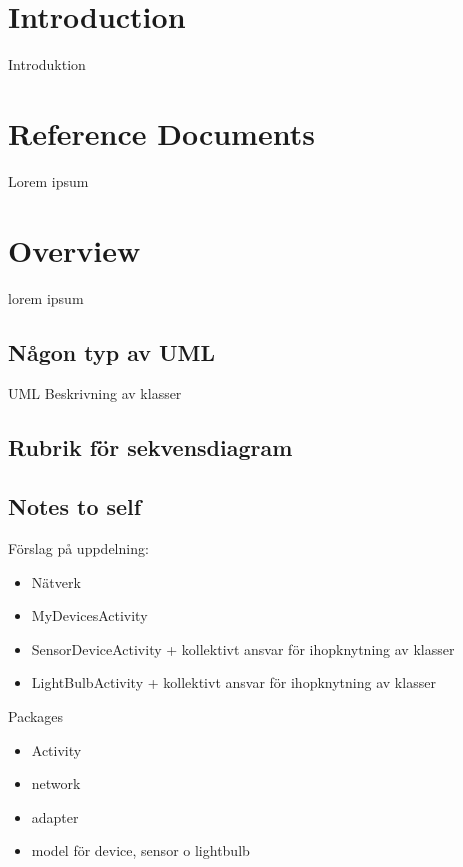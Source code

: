 \documentclass[a4paper]{article}
\begin{document}
\tableofcontents
\newpage
{}

\section{Introduction}
Introduktion

\section{Reference Documents}
Lorem ipsum


\section{Overview}
lorem ipsum

\subsection{Någon typ av UML}
UML
Beskrivning av klasser

\subsection{Rubrik för sekvensdiagram}

\subsection{Notes to self}
Förslag på uppdelning:
\begin{itemize}
\item Nätverk
\item MyDevicesActivity
\item SensorDeviceActivity + kollektivt ansvar för ihopknytning av klasser
\item LightBulbActivity + kollektivt ansvar för ihopknytning av klasser
\end{itemize}
Packages
\begin{itemize}
\item Activity
\item network
\item adapter
\item model för device, sensor o lightbulb
\end{itemize}
\end{document}
